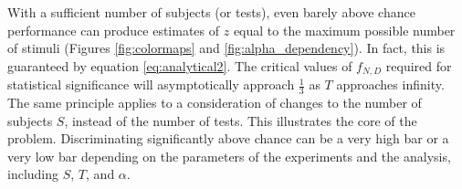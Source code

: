 \documentclass[letterpaper,twocolumn,10pt]{article}
\begin{document}
With a sufficient number of subjects (or tests), 
even barely above chance performance can produce estimates of $z$ equal to the maximum possible number of stimuli (Figures \ref{fig:colormaps} and \ref{fig:alpha_dependency}).  
In fact, this is guaranteed by equation \ref{eq:analytical2}.  
The critical values of $f_{N,D}$ required for statistical significance will asymptotically approach $\frac{1}{3}$ 
as $T$ approaches infinity.  
The same principle applies to a consideration of changes to the number of subjects $S$, 
instead of the number of tests.  
This illustrates the core of the problem.  
Discriminating significantly above chance can be a very high bar or a very low bar 
depending on the parameters of the experiments and the analysis, including $S$, $T$, and $\alpha$.  

{\footnotesize 
}
\end{document}
